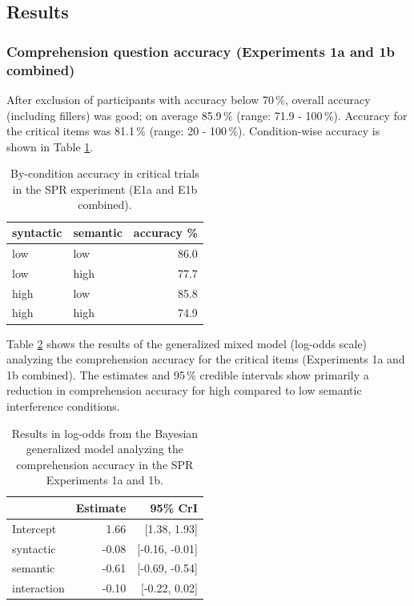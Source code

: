 \documentclass[a4paper, man, floatsintext]{apa7}
\begin{document}
\subsection{Results}
\subsubsection{Comprehension question accuracy (Experiments 1a and 1b combined)}

After exclusion of participants with accuracy below 70\,\%, overall accuracy (including fillers) was good; on average 85.9\,\% (range: 71.9 - 100\,\%). Accuracy for the critical items was 81.1\,\% (range: 20 - 100\,\%). Condition-wise accuracy is shown in Table \ref{tab:spr_acc}.

\begin{table}[]
    \caption{By-condition accuracy in critical trials in the SPR experiment (E1a and E1b combined).}
    \label{tab:spr_acc}
    \centering
    \begin{tabular}{llr}
    \toprule
    syntactic & semantic & accuracy \%\\
    \midrule
        low &  low & 86.0\\
        low &  high & 77.7\\
        high &  low & 85.8\\
        high &  high & 74.9\\
    \bottomrule
    \end{tabular}
\end{table}

Table \ref{tab:spr_acc_mod} shows the results of the generalized mixed model (log-odds scale) analyzing the comprehension accuracy for the critical items (Experiments 1a and 1b combined). The estimates and 95\,\% credible intervals show primarily a reduction in comprehension accuracy for high compared to low semantic interference conditions.

\begin{table}[H]
    \caption{Results in log-odds from the Bayesian generalized model analyzing the comprehension accuracy in the SPR Experiments 1a and 1b.}
    \label{tab:spr_acc_mod}
    \centering
    \begin{tabular}{lrr}
    \toprule
    & Estimate &  95\% CrI  \\
    \midrule
Intercept& 1.66 &   [1.38, 1.93]\\
syntactic& -0.08 &  [-0.16, -0.01]\\
semantic&  -0.61 & [-0.69, -0.54]\\
interaction& -0.10&  [-0.22, 0.02]\\
    \bottomrule
    \end{tabular}
\end{table}
\end{document}
